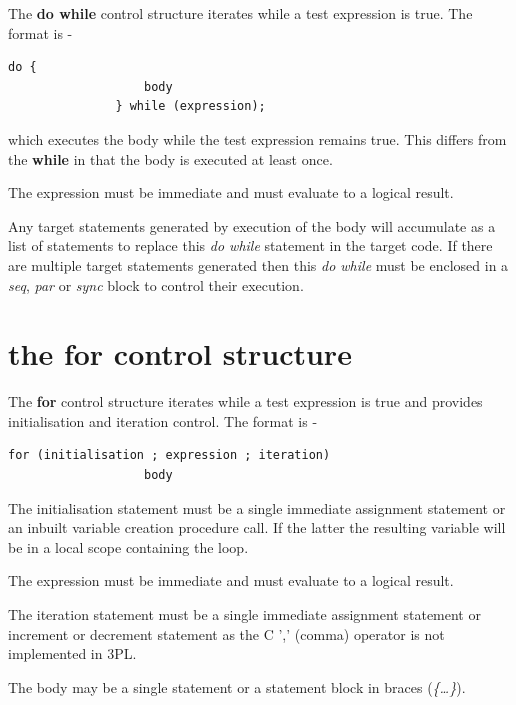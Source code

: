         The {\bf do while} control structure iterates while
        a test expression is true. The format is -
        \begin{lstlisting}[gobble=8, language=threepl]
               do {
                   body
               } while (expression);
        \end{lstlisting}
        which executes the body while the test expression
        remains true. This differs from the {\bf while} in
        that the body is executed at least once.

        The expression must be immediate and must evaluate to a logical
        result.
        
        Any target statements generated by execution of the body will
        accumulate as a list of statements to replace this {\em do while}
        statement in the target code. If there are multiple target statements
        generated then this {\em do while} must be enclosed in a {\em seq},
        {\em par} or {\em sync} block to control their execution.



    \section{the {\bf for} control structure}\label{sec:im_for_struct}

        The {\bf for} control structure iterates while a test expression is
        true and provides initialisation and iteration control. The format
        is -
        \begin{lstlisting}[gobble=8, language=threepl]
               for (initialisation ; expression ; iteration)
                   body
        \end{lstlisting}
        The initialisation statement must be a single immediate assignment
        statement or an inbuilt variable creation procedure call. If the latter
        the resulting variable will be in a local scope containing the loop.

        The expression must be immediate and must evaluate to a logical
        result.
        
        The iteration statement must be a single immediate assignment statement
        or increment or decrement statement as the C ',' (comma) operator is not
        implemented in 3PL.

        The body may be a single statement or a statement block in braces
        ({\em \{\dots\}}).


